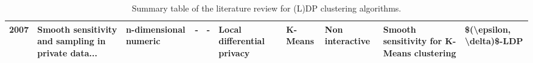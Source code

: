 \begin{landscape}
\begin{table}[ht]
\begin{adjustbox}{width=1.8\textwidth}
\begin{tabular}{rlllllllll}
        2007 \citep{nissim_smooth_2007}                 & Smooth sensitivity and sampling in private data...                                                            & n-dimensional numeric                & -                                                  & -                                       & Local differential privacy & K-Means             & Non interactive & Smooth sensitivity for K-Means clustering & \$(\textbackslash epsilon, \textbackslash delta)\$-LDP                                                        \\
        \bottomrule
      \end{tabular}
    \end{adjustbox}
    \caption{Summary table of the literature review for (L)DP clustering algorithms.}
    \label{tab:summary_table_kmeans}
  \end{table}


  \begin{table}[ht]
    \centering
    \begin{adjustbox}{width=1.8\textwidth}


\end{adjustbox}
\end{table}
\end{landscape}

